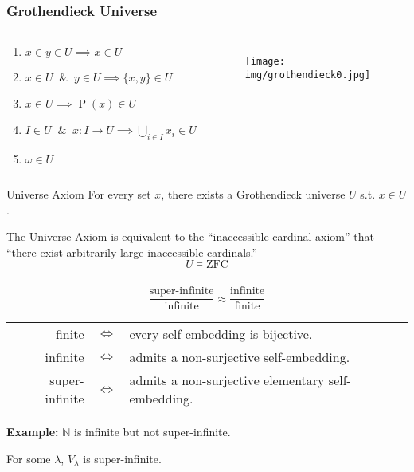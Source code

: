 \documentclass[UTF8,aspectratio=43,11pt,colorlinks,compress,openany]{beamer}%
\begin{document}
\begin{frame}\frametitle{Grothendieck Universe}
\begin{columns}
\begin{definition}
\begin{enumerate}
\item $x\in y\in U\implies x\in U$
\item $x\in U\;\; \&\;\; y\in U\implies \{x,y\}\in U$
\item $x\in U\implies \operatorname{P}(x)\in U$
\item $I\in U\;\; \&\;\; x: I\to U\implies\bigcup\limits_{i\in I}x_i\in U$
\item $\omega\in U$
\end{enumerate}
\end{definition}
\begin{figure}
\texttt{[image: img/grothendieck0.jpg]}
\end{figure}
\end{columns}
\begin{block}{Universe Axiom}
For every set $x$, there exists a Grothendieck universe $U$ s.t. $x\in U$.
\end{block}
\begin{center}
\end{center}
The Universe Axiom is equivalent to the ``inaccessible cardinal axiom'' that ``there exist arbitrarily large inaccessible cardinals.''
\[U\vDash\mathrm{ZFC}\]
\end{frame}

\begin{frame}\frametitle{}
\[\dfrac{\text{super-infinite}}{\text{infinite}} \approx \dfrac{\text{infinite}}{\text{finite}}\]
\begin{tabu}{rcl}
finite &$\iff$ &every self-embedding is bijective.\\
infinite &$\iff$ &admits a non-surjective self-embedding.\\
super-infinite &$\iff$ &admits a non-surjective elementary self-embedding.
\end{tabu}
\textbf{Example:} $\mathbb{N}$ is infinite but not super-infinite.
\begin{axiom}[Axiom I3]
For some $\lambda$, $V_\lambda$ is super-infinite.
\end{axiom}
\end{frame}
\end{document}
